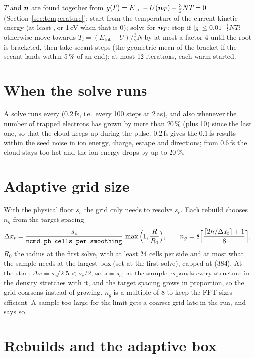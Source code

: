 $T$ and $\bm{n}$ are found together from $g(T) = E_{\mathrm{tot}} - U(\bm{n}_T) - \frac32NT = 0$
(Section~\ref{sec:temperature}):
start from the temperature of the current kinetic energy (at least , or 1\,eV when that is 0); solve for $\bm{n}_T$; stop if
$|g|\le0.01\cdot\frac32NT$; otherwise move towards $T_t = (E_{\mathrm{tot}}-U)/\frac32N$ by at most a factor 4 until the
root is bracketed, then take secant steps (the geometric mean of the bracket if the secant lands within 5\,\% of an
end); at most 12 iterations, each warm-started.

\section{When the solve runs}

A solve runs every  (0.2\,fs, i.e.\ every 100 steps at 2\,as), and also whenever the number of
trapped electrons has grown by more than 20\,\% (plus 10) since the last one, so that the cloud keeps up during the
pulse.
0.2\,fs gives the 0.1\,fs results within the seed noise in ion energy, charge, escape and directions; from 0.5\,fs the
cloud stays too hot and the ion energy drops by up to 20\,\%.

\section{Adaptive grid size}

With the physical floor $s_e$ the grid only needs to resolve $s_e$.
Each rebuild chooses $n_g$ from the target spacing
\begin{equation}
  \Delta x_t = \frac{s_e}{\texttt{mcmd-pb-cells-per-smoothing}}\,\max\Big(1,\frac{R}{R_0}\Big),\qquad
  n_g = 8\Big\lceil\frac{\lceil 2h/\Delta x_t\rceil+1}{8}\Big\rceil,
\end{equation}
$R_0$ the radius at the first solve, with at least 24 cells per side and at most what the sample needs at the
largest box (set at the first solve), capped at  (384).
At the start $\Delta x = s_e/2.5 < s_e/2$, so $s=s_e$; as the sample expands every structure in the density stretches
with it, and the target spacing grows in proportion, so the grid coarsens instead of growing.
$n_g$ is a multiple of 8 to keep the FFT sizes efficient.
A sample too large for the limit gets a coarser grid late in the run, and  says so.

\section{Rebuilds and the adaptive box}

